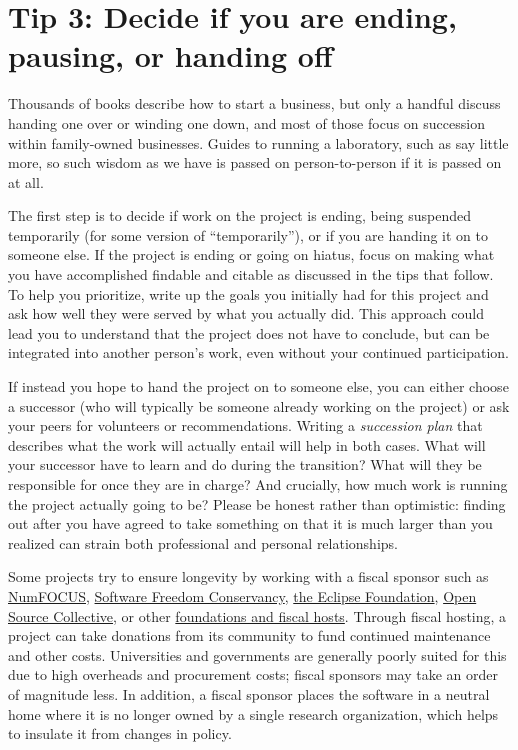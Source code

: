 \documentclass[10pt,letterpaper]{article}
\begin{document}
\section*{Tip 3: Decide if you are ending, pausing, or handing off}

Thousands of books describe how to start a business, but only a handful discuss handing one over or winding one down, and most of those focus on succession within family-owned businesses.
Guides to running a laboratory, such as \cite{Barker2010, Cohen2018} say little more, so such wisdom as we have is passed on person-to-person if it is passed on at all.

The first step is to decide if work on the project is ending, being suspended temporarily (for some version of ``temporarily''), or if you are handing it on to someone else.
If the project is ending or going on hiatus, focus on making what you have accomplished findable and citable as discussed in the tips that follow.
To help you prioritize, write up the goals you initially had for this project
and ask how well they were served by what you actually did. This approach could lead you to understand that the project does not have to conclude, but can be integrated into another person's work, even without your continued participation.

If instead you hope to hand the project on to someone else, you can either choose a successor
(who will typically be someone already working on the project) or ask your peers for volunteers or recommendations.
Writing a \emph{succession plan} that describes what the work will actually entail will help in both cases.
What will your successor have to learn and do during the transition?
What will they be responsible for once they are in charge?
And crucially, how much work is running the project actually going to be?
Please be honest rather than optimistic: finding out after you have agreed to take something on that it is much larger than you realized can strain both professional and personal relationships.

Some projects try to ensure longevity by working with a fiscal sponsor such as
\href{https://numfocus.org/}{NumFOCUS},
\href{https://sfconservancy.org/}{Software Freedom Conservancy},
\href{https://www.eclipse.org/}{the Eclipse Foundation},
\href{https://oscollective.org/}{Open Source Collective},
or other \href{https://sustainoss.org/academic-map/organizations/index.html}{foundations and fiscal hosts}.
Through fiscal hosting, a project can take donations from its community to fund continued maintenance and other costs.
Universities and governments are generally poorly suited for this due to high overheads and procurement costs; fiscal sponsors may take an order of magnitude less.
In addition, a fiscal sponsor places the software in a neutral home where it is no longer owned by a single research organization,
which helps to insulate it from changes in policy.
\end{document}
